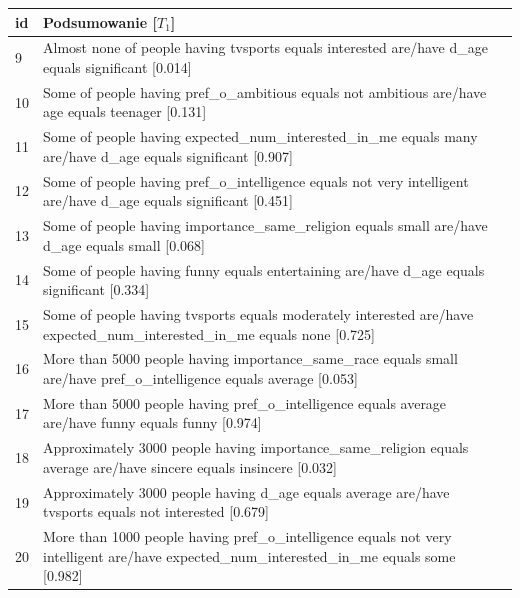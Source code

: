 \documentclass{classrep}
\begin{document}
\begin{center}
  \begin{table}[H]
    \begin{tabularx}{\textwidth}{lXc}
    
    id & Podsumowanie [$T_1$] \\ \hline 
  
    9 & Almost none of people having tvsports equals interested are/have d\_age equals significant [0.014] \\ \hline
    10 & Some of people having pref\_o\_ambitious equals not ambitious are/have age equals teenager [0.131] \\ \hline
    11 & Some of people having expected\_num\_interested\_in\_me equals many are/have d\_age equals significant [0.907] \\ \hline
    12 & Some of people having pref\_o\_intelligence equals not very intelligent are/have d\_age equals significant [0.451] \\ \hline
    13 & Some of people having importance\_same\_religion equals small are/have d\_age equals small [0.068] \\ \hline
    14 & Some of people having funny equals entertaining are/have d\_age equals significant [0.334]\\ \hline
    15 & Some of people having tvsports equals moderately interested are/have expected\_num\_interested\_in\_me equals none [0.725] \\ \hline 
    16 & More than 5000 people having importance\_same\_race equals small are/have pref\_o\_intelligence equals average [0.053]\\ \hline 
    17 & More than 5000 people having pref\_o\_intelligence equals average are/have funny equals funny [0.974]\\ \hline 
    18 & Approximately 3000 people having importance\_same\_religion equals average are/have sincere equals insincere [0.032]\\ \hline
    19 & Approximately 3000 people having d\_age equals average are/have tvsports equals not interested [0.679] \\ \hline
    20 & More than 1000 people having pref\_o\_intelligence equals not very intelligent are/have expected\_num\_interested\_in\_me equals some [0.982] \\ \hline

\end{tabularx}
\end{table}
\end{center}
\end{document}
